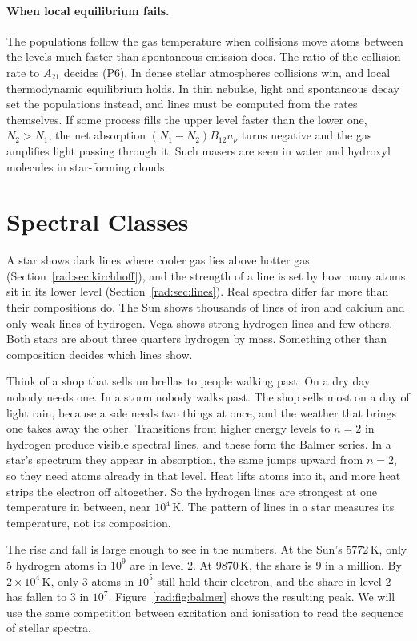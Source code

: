 \paragraph{When local equilibrium fails.} The populations follow the gas temperature when collisions move atoms between the levels much faster than spontaneous emission does. The ratio of the collision rate to $A_{21}$ decides (P6). In dense stellar atmospheres collisions win, and local thermodynamic equilibrium holds. In thin nebulae, light and spontaneous decay set the populations instead, and lines must be computed from the rates themselves. If some process fills the upper level faster than the lower one, $N_2>N_1$, the net absorption $(N_1-N_2)B_{12}u_\nu$ turns negative and the gas amplifies light passing through it. Such masers are seen in water and hydroxyl molecules in star-forming clouds.

\section{Spectral Classes}
\label{rad:sec:spectral}

A star shows dark lines where cooler gas lies above hotter gas (Section~\ref{rad:sec:kirchhoff}), and the strength of a line is set by how many atoms sit in its lower level (Section~\ref{rad:sec:lines}). Real spectra differ far more than their compositions do. The Sun shows thousands of lines of iron and calcium and only weak lines of hydrogen. Vega shows strong hydrogen lines and few others. Both stars are about three quarters hydrogen by mass. Something other than composition decides which lines show.

Think of a shop that sells umbrellas to people walking past. On a dry day nobody needs one. In a storm nobody walks past. The shop sells most on a day of light rain, because a sale needs two things at once, and the weather that brings one takes away the other. Transitions from higher energy levels to $n=2$ in hydrogen produce visible spectral lines, and these form the Balmer series. In a star's spectrum they appear in absorption, the same jumps upward from $n=2$, so they need atoms already in that level. Heat lifts atoms into it, and more heat strips the electron off altogether. So the hydrogen lines are strongest at one temperature in between, near $10^4\,\mathrm K$. The pattern of lines in a star measures its temperature, not its composition.

The rise and fall is large enough to see in the numbers. At the Sun's $5772\,\mathrm K$, only $5$ hydrogen atoms in $10^9$ are in level $2$. At $9870\,\mathrm K$, the share is $9$ in a million. By $2\times10^4\,\mathrm K$, only $3$ atoms in $10^5$ still hold their electron, and the share in level $2$ has fallen to $3$ in $10^7$. Figure~\ref{rad:fig:balmer} shows the resulting peak. We will use the same competition between excitation and ionisation to read the sequence of stellar spectra.

